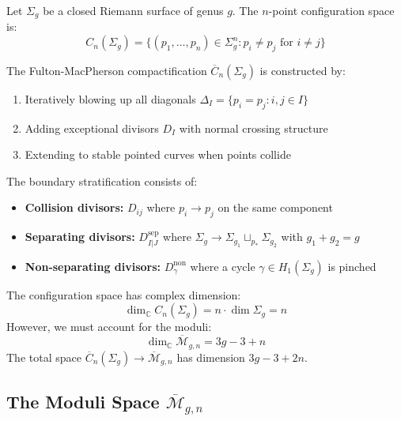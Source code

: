 \begin{definition}
\label{def:higher-genus-config-space}
Let $\Sigma_g$ be a closed Riemann surface of genus $g$. The $n$-point configuration space is:
\begin{equation}
C_n(\Sigma_g) = \{(p_1, \ldots, p_n) \in \Sigma_g^n : p_i \neq p_j \text{ for } i \neq j\}
\end{equation}

The Fulton-MacPherson compactification $\overline{C}_n(\Sigma_g)$ is constructed by:
\begin{enumerate}
\item Iteratively blowing up all diagonals $\Delta_{I} = \{p_i = p_j : i,j \in I\}$
\item Adding exceptional divisors $D_I$ with normal crossing structure
\item Extending to stable pointed curves when points collide
\end{enumerate}

The boundary stratification consists of:
\begin{itemize}
\item \textbf{Collision divisors:} $D_{ij}$ where $p_i \to p_j$ on the same component
\item \textbf{Separating divisors:} $D_{I|J}^{\text{sep}}$ where $\Sigma_g \to \Sigma_{g_1} \sqcup_{p_*} \Sigma_{g_2}$ with $g_1 + g_2 = g$
\item \textbf{Non-separating divisors:} $D_\gamma^{\text{non}}$ where a cycle $\gamma \in H_1(\Sigma_g)$ is pinched
\end{itemize}
\end{definition}

\begin{remark}
\label{rem:dimension-higher-genus}
The configuration space has complex dimension:
\begin{equation}
\dim_{\mathbb{C}} C_n(\Sigma_g) = n \cdot \dim \Sigma_g = n
\end{equation}
However, we must account for the moduli:
\begin{equation}
\dim_{\mathbb{C}} \overline{\mathcal{M}}_{g,n} = 3g - 3 + n
\end{equation}
The total space $\overline{C}_n(\Sigma_g) \to \overline{\mathcal{M}}_{g,n}$ has dimension $3g - 3 + 2n$.
\end{remark}

\subsection{The Moduli Space $\overline{\mathcal{M}}_{g,n}$}

